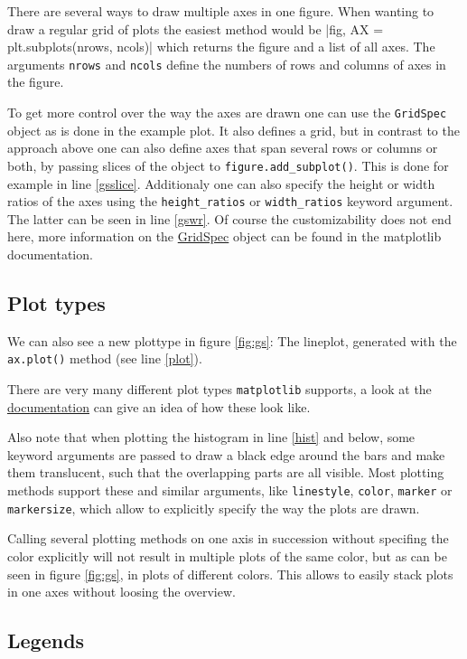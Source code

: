 \documentclass[a4paper, 11pt, twocolumn]{article}
\newcommand{\mpl}{\texttt{matplotlib}\xspace}
\newcommand{\pl}[1]{\mbox{\texttt{#1}\xspace}}
\begin{document}
There are several ways to draw multiple axes in one figure. When wanting to
draw a regular grid of plots the easiest method would be
|fig, AX = plt.subplots(nrows, ncols)|
which returns the figure and a list of all axes. The arguments \pl{nrows} and 
\pl{ncols} define the numbers of rows and columns of axes in the figure.

To get more control over the way the axes are drawn one can use the
\pl{GridSpec} object as is done in the example plot. It also defines a grid,
but in contrast to the approach above one can also define axes that span
several rows or columns or both, by passing slices of the object to
\pl{figure.add\_subplot()}. This is done for example in line \ref{gsslice}.
Additionaly one can also specify the height or width ratios of the axes using
the \pl{height\_ratios} or \pl{width\_ratios} keyword argument. The latter can
be seen in line \ref{gswr}. Of course the customizability does not end here,
more information on the
\href{https://matplotlib.org/users/gridspec.html}{GridSpec} object can be found
in the matplotlib documentation.


\subsection{Plot types}

We can also see a new plottype in figure \ref{fig:gs}: The lineplot, generated
with the \pl{ax.plot()} method (see line \ref{plot}).

There are very many different plot types \mpl supports, a look at the
\href{https://matplotlib.org/api/axes_api.html#plotting}{documentation} can
give an idea of how these look like.

Also note that when plotting the histogram in line \ref{hist} and below, some
keyword arguments are passed to draw a black edge around the bars and make them
translucent, such that the overlapping parts are all visible. Most plotting
methods support these and similar arguments, like \pl{linestyle}, \pl{color},
\pl{marker} or \pl{markersize}, which allow to explicitly specify the way the
plots are drawn.

Calling several plotting methods on one axis in succession without specifing the color explicitly will not result in multiple plots of the same color, but as
can be seen in figure \ref{fig:gs}, in plots of different colors. This allows
to easily stack plots in one axes without loosing the overview.

\subsection{Legends}
\end{document}
